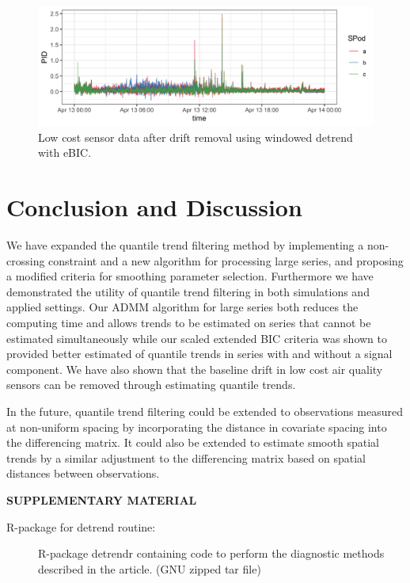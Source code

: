 \documentclass[12pt]{article}
\begin{document}
	\begin{figure}
		\includegraphics[width = \linewidth]{Figures/corrected_data.png}
		\caption{Low cost sensor data after drift removal using windowed detrend with eBIC.}
	\end{figure}

	

\section{Conclusion and Discussion}
\label{sec:discussion}

	We have expanded the quantile trend filtering method by implementing a non-crossing constraint and a new algorithm for processing large series, and proposing a modified criteria for smoothing parameter selection. Furthermore we have demonstrated the utility of quantile trend filtering in both simulations and applied settings. Our ADMM algorithm for large series both reduces the computing time and allows trends to be estimated on series that cannot be estimated simultaneously while our scaled extended BIC criteria was shown to provided better estimated of quantile trends in series with and without a signal component. We have also shown that the baseline drift in low cost air quality sensors can be removed through estimating quantile trends.

	In the future, quantile trend filtering could be extended to observations measured at non-uniform spacing by incorporating the distance in covariate spacing into the differencing matrix. It could also be extended to estimate smooth spatial trends by a similar adjustment to the differencing matrix based on spatial distances between observations.

	\label{sec:conc}


	\bigskip
	\begin{center}
		{\large\bf SUPPLEMENTARY MATERIAL}
	\end{center}

	\begin{description}

		\item[R-package for detrend routine:] R-package detrendr containing code to perform the diagnostic methods described in the article. (GNU zipped tar file)

	\end{description}


	
	
\end{document}
